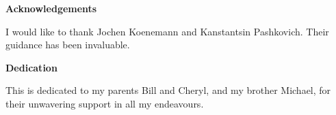 
\begin{center}\textbf{Acknowledgements}\end{center}

I would like to thank Jochen Koenemann and Kanstantsin Pashkovich. Their guidance has been invaluable.
\cleardoublepage


\begin{center}\textbf{Dedication}\end{center}

This is dedicated to my parents Bill and Cheryl, and my brother Michael, for their unwavering support in all my endeavours.
\cleardoublepage

\renewcommand\contentsname{Table of Contents}
\tableofcontents
\cleardoublepage
{}

\listoftables
\cleardoublepage
{}		%

\listoffigures
\cleardoublepage
{}		%



